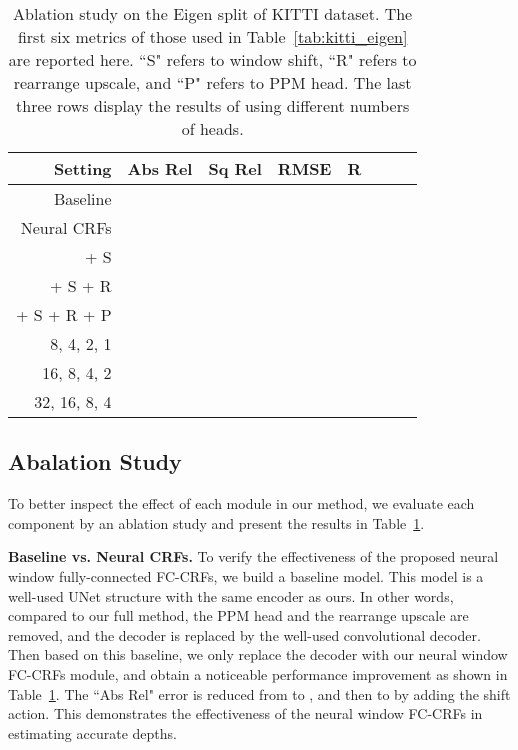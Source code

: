 \documentclass[10pt,twocolumn,letterpaper]{article}
\begin{document}
\setlength{\tabcolsep}{3pt}
\begin{table}[]
\small
\centering
\begin{tabular}{r c c c c c c c}
\toprule
Setting & Abs Rel & Sq Rel & RMSE & R &  &   \\
\midrule
Baseline &  &  &  &  &  &   \\
Neural CRFs &  &  &  &  &  &   \\
+ S &  &  &  &  &  &   \\
+ S + R &  &  &  &  &  &   \\
+ S + R + P &  &  &  &  &  &   \\
\midrule
8, 4, 2, 1 &  &  &  &  &  &    \\
16, 8, 4, 2 &  &  &  &  &  &    \\
32, 16, 8, 4 &  &  &  &  &  &   \\
\bottomrule
\end{tabular}
\caption{Ablation study on the Eigen split of KITTI dataset. The first six metrics of those used in Table~\ref{tab:kitti_eigen} are reported here. ``S" refers to window shift, ``R" refers to rearrange upscale, and ``P" refers to PPM head. The last three rows display the results of using different numbers of heads.}
\label{tab:ablation}
\vspace{-5mm}
\end{table}
\setlength{\tabcolsep}{3pt}



\subsection{Abalation Study}

To better inspect the effect of each module in our method, we evaluate each component by an ablation study and present the results in Table~\ref{tab:ablation}.

\textbf{Baseline vs. Neural CRFs. } To verify the effectiveness of the proposed neural window fully-connected FC-CRFs, we build a baseline model. This model is a well-used UNet structure with the same encoder as ours. In other words, compared to our full method, the PPM head and the rearrange upscale are removed, and the decoder is replaced by the well-used convolutional decoder.
Then based on this baseline, we only replace the decoder with our neural window FC-CRFs module, and obtain a noticeable performance improvement as shown in Table~\ref{tab:ablation}.
The ``Abs Rel" error is reduced from  to , and then to  by adding the shift action.
This demonstrates the effectiveness of the neural window FC-CRFs in estimating accurate depths. 
\end{document}
